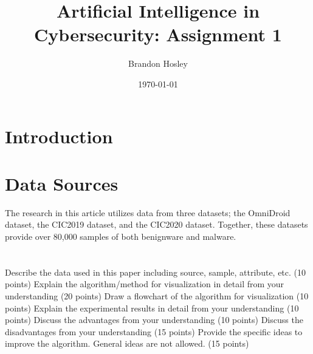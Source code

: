 \documentclass[]{article}
\title{Artificial Intelligence in Cybersecurity: Assignment 1}
\author{Brandon Hosley}
\date{\today}
\begin{document}
	\maketitle
	
\section{Introduction}

\section{Data Sources}

The research in this article utilizes data from three datasets; 
the OmniDroid \cite{Martin2019} dataset,  
the CIC2019 \cite{Taheri2019} dataset, and
the CIC2020 \cite{Rahali2020} dataset.
Together, these datasets provide over 80,000 samples of both benignware and malware.

\section{}

Describe the data used in this paper including source, sample, attribute, etc. (10 points)
Explain the algorithm/method for visualization in detail from your understanding (20 points)
Draw a flowchart of the algorithm for visualization (10 points)
Explain the experimental results in detail from your understanding (10 points)
Discuss the advantages from your understanding (10 points)
Discuss the disadvantages from your understanding (15 points)
Provide the specific ideas to improve the algorithm. General ideas are not allowed. (15 points)

\clearpage


\end{document}
